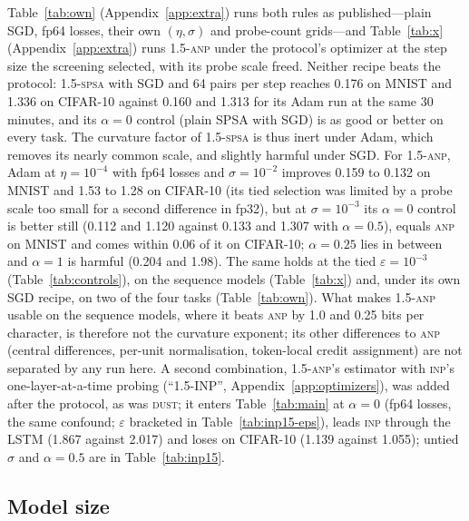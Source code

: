 \documentclass{article}
\newcommand{\method}[1]{\textsc{#1}}
\newcommand{\SPSAb}{\method{1.5-spsa}}
\newcommand{\ANP}{\method{anp}}
\newcommand{\ANPb}{\method{1.5-anp}}
\newcommand{\INP}{\method{inp}}
\newcommand{\DUST}{\method{dust}}
\begin{document}
Table~\ref{tab:own} (Appendix~\ref{app:extra}) runs both rules as published---plain
SGD, fp64 losses, their own $(\eta,\sigma)$ and probe-count grids---and
Table~\ref{tab:x} (Appendix~\ref{app:extra}) runs \ANPb{} under the protocol's optimizer at the step size the
screening selected, with its probe scale freed. Neither recipe beats the protocol: \SPSAb{} with SGD and 64 pairs per step reaches
0.176 on MNIST and 1.336 on CIFAR-10 against 0.160 and 1.313 for its Adam run at the
same 30 minutes, and its $\alpha=0$ control (plain SPSA with SGD) is as good or better on every task. The curvature factor of \SPSAb{} is thus inert under Adam, which removes its nearly
common scale, and slightly harmful under SGD. For \ANPb{}, Adam at $\eta=10^{-4}$ with fp64 losses and
$\sigma=10^{-2}$ improves 0.159 to 0.132 on MNIST and 1.53 to 1.28 on CIFAR-10 (its tied
selection was limited by a probe scale too small for a second difference in fp32), but
at $\sigma=10^{-3}$ its $\alpha=0$ control is better still (0.112 and 1.120 against
0.133 and 1.307 with $\alpha=0.5$), equals \ANP{} on MNIST and comes within 0.06 of it on
CIFAR-10; $\alpha=0.25$ lies in between and $\alpha=1$ is harmful (0.204 and 1.98). The
same holds at the tied $\varepsilon=10^{-3}$ (Table~\ref{tab:controls}), on the sequence
models (Table~\ref{tab:x}) and, under its own SGD recipe, on two of the four tasks
(Table~\ref{tab:own}). What makes \ANPb{} usable on the sequence models, where it beats
\ANP{} by 1.0 and 0.25 bits per character, is therefore not the curvature exponent; its
other differences to \ANP{} (central differences, per-unit normalisation, token-local
credit assignment) are not separated by any run here. A second combination, \ANPb{}'s estimator with \INP{}'s one-layer-at-a-time probing
(``1.5-INP'', Appendix~\ref{app:optimizers}), was added after the protocol, as was \DUST{};
it enters Table~\ref{tab:main} at $\alpha=0$ (fp64 losses, the same confound;
$\varepsilon$ bracketed in Table~\ref{tab:inp15-eps}), leads \INP{} through the LSTM
(1.867 against 2.017) and loses on CIFAR-10 (1.139 against 1.055); untied $\sigma$ and
$\alpha=0.5$ are in Table~\ref{tab:inp15}.


\subsection{Model size}
\label{sec:scale}
\end{document}
